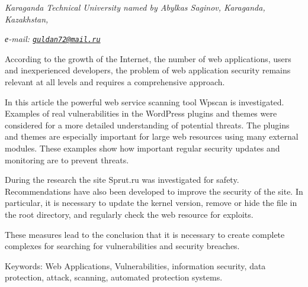 \begin{affiliation}
\emph{Karaganda Technical University named by Abylkas Saginov, Karaganda, Kazakhstan,}

\emph{е-mail: \href{mailto:guldan72@mail.ru}{\nolinkurl{guldan72@mail.ru}}}
\end{affiliation}

According to the growth of the Internet, the number of web applications,
users and inexperienced developers, the problem of web application
security remains relevant at all levels and requires a comprehensive
approach.

In this article the powerful web service scanning tool Wpscan is
investigated. Examples of real vulnerabilities in the WordPress plugins
and themes were considered for a more detailed understanding of
potential threats. The plugins and themes are especially important for
large web resources using many external modules. These examples show how
important regular security updates and monitoring are to prevent
threats.

During the research the site Sprut.ru was investigated for safety.
Recommendations have also been developed to improve the security of the
site. In particular, it is necessary to update the kernel version,
remove or hide the file in the root directory, and regularly check the
web resource for exploits.

These measures lead to the conclusion that it is necessary to create
complete complexes for searching for vulnerabilities and security
breaches.

Keywords: Web Applications, Vulnerabilities, information security, data
protection, attack, scanning, automated protection systems.

